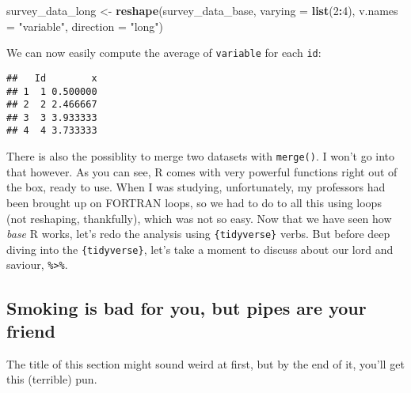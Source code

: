 \documentclass[
]{article}
\newenvironment{Shaded}{\begin{snugshade}}{\end{snugshade}}
\newcommand{\DataTypeTok}[1]{\textcolor[rgb]{0.13,0.29,0.53}{#1}}
\newcommand{\DecValTok}[1]{\textcolor[rgb]{0.00,0.00,0.81}{#1}}
\newcommand{\KeywordTok}[1]{\textcolor[rgb]{0.13,0.29,0.53}{\textbf{#1}}}
\newcommand{\NormalTok}[1]{#1}
\newcommand{\OperatorTok}[1]{\textcolor[rgb]{0.81,0.36,0.00}{\textbf{#1}}}
\newcommand{\StringTok}[1]{\textcolor[rgb]{0.31,0.60,0.02}{#1}}
\begin{document}
\begin{Shaded}
\begin{Highlighting}[]
\NormalTok{survey\_data\_long \textless{}{-}}\StringTok{ }\KeywordTok{reshape}\NormalTok{(survey\_data\_base,}
        \DataTypeTok{varying =} \KeywordTok{list}\NormalTok{(}\DecValTok{2}\OperatorTok{:}\DecValTok{4}\NormalTok{), }\DataTypeTok{v.names =} \StringTok{"variable"}\NormalTok{, }\DataTypeTok{direction =} \StringTok{"long"}\NormalTok{)}
\end{Highlighting}
\end{Shaded}

We can now easily compute the average of \texttt{variable} for each \texttt{id}:

\begin{Shaded}
\end{Shaded}

\begin{verbatim}
##   Id        x
## 1  1 0.500000
## 2  2 2.466667
## 3  3 3.933333
## 4  4 3.733333
\end{verbatim}

There is also the possiblity to merge two datasets with \texttt{merge()}. I won't go into that however.
As you can see, R comes with very powerful functions right out of the box, ready to use. When I was
studying, unfortunately, my professors had been brought up on FORTRAN loops, so we had to do to all
this using loops (not reshaping, thankfully), which was not so easy.
Now that we have seen how \emph{base} R works, let's redo the analysis using \texttt{\{tidyverse\}} verbs.
But before deep diving into the \texttt{\{tidyverse\}}, let's take a moment to discuss about our lord and
saviour, \texttt{\%\textgreater{}\%}.

\hypertarget{smoking-is-bad-for-you-but-pipes-are-your-friend}{%
\subsection{Smoking is bad for you, but pipes are your friend}\label{smoking-is-bad-for-you-but-pipes-are-your-friend}}

The title of this section might sound weird at first, but by the end of it, you'll get this
(terrible) pun.
\end{document}
